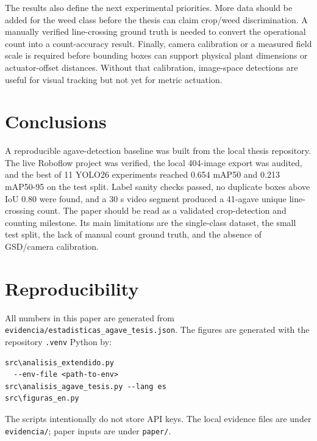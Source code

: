 \documentclass[10pt,twocolumn]{article}
\begin{document}
The results also define the next experimental priorities. More data should be added for the weed class before the thesis can claim crop/weed discrimination. A manually verified line-crossing ground truth is needed to convert the operational count into a count-accuracy result. Finally, camera calibration or a measured field scale is required before bounding boxes can support physical plant dimensions or actuator-offset distances. Without that calibration, image-space detections are useful for visual tracking but not yet for metric actuation.

\section{Conclusions}

A reproducible agave-detection baseline was built from the local thesis repository. The live Roboflow project was verified, the local 404-image export was audited, and the best of 11 YOLO26 experiments reached 0.654 mAP50 and 0.213 mAP50-95 on the test split. Label sanity checks passed, no duplicate boxes above IoU 0.80 were found, and a 30 s video segment produced a 41-agave unique line-crossing count. The paper should be read as a validated crop-detection and counting milestone. Its main limitations are the single-class dataset, the small test split, the lack of manual count ground truth, and the absence of GSD/camera calibration.

\section*{Reproducibility}

All numbers in this paper are generated from \texttt{evidencia/estadisticas\_agave\_tesis.json}. The figures are generated with the repository \texttt{.venv} Python by:

\begin{verbatim}
src\analisis_extendido.py
  --env-file <path-to-env>
src\analisis_agave_tesis.py --lang es
src\figuras_en.py
\end{verbatim}

The scripts intentionally do not store API keys. The local evidence files are under \texttt{evidencia/}; paper inputs are under \texttt{paper/}.
\end{document}
